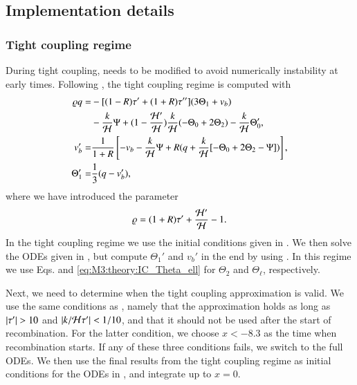 \subsection{Implementation details}\label{ssec:M3:implementations} 
\subsubsection{Tight coupling regime} \label{sssec:M3:implementations:tight_coupling_regime}
During tight coupling,  needs to be modified to avoid numerically instability at early times. Following \citeauthor{callin}, the tight coupling regime is computed with 
\begin{subequations} \label{eq:M3:implementations:TC_ODEs}
    \begin{align}
        \varrho q =& -[(1-R)\tau' + (1+R)\tau''](3\Theta_1 + v_b) \nonumber \\
            & -\frac{k}{\mathcal{H}}\Psi + (1-\frac{\mathcal{H}'}{\mathcal{H}})\frac{k}{\mathcal{H}}(-\Theta_0 + 2\Theta_2) - \frac{k}{\mathcal{H}}\Theta_0', \label{eq:M3:implementations:TC_ODEs_q} \\
        v_b' =& \frac{1}{1+R}\left[ -v_b-\frac{k}{\mathcal{H}}\Psi + R(q+\frac{k}{\mathcal{H}}[-\Theta_0+2\Theta_2-\Psi]) \right], \label{eq:M3:implementations:TC_ODEs_v_b} \\
        \Theta_1' =& \frac{1}{3}(q-v_b'), \label{eq:M3:implementations:TC_ODEs_Theta_1} 
    \end{align}
\end{subequations} 
where we have introduced the parameter 
\begin{equation} \label{eq:M3:implementations:q_prefactor}
    \varrho = (1+R)\tau' + \frac{\mathcal{H}'}{\mathcal{H}} - 1.
\end{equation}
In the tight coupling regime we use the initial conditions given in . We then solve the ODEs given in , but compute $\Theta_1'$ and $v_b'$ in the end by using . In this regime we use Eqs.  and \eqref{eq:M3:theory:IC_Theta_ell} for $\Theta_2$ and $\Theta_\ell$, respectively. 

Next, we need to determine when the tight coupling approximation is valid. We use the same conditions as \citeauthor{callin}, namely that the approximation holds as long as $\abs{\tau'}>10$ and $\abs{k/\mathcal{H}\tau'}<1/10$, and that it should not be used after the start of recombination. For the latter condition, we choose $x<-8.3$ as the time when recombination starts. If any of these three conditions fails, we switch to the full ODEs. We then use the final results from the tight coupling regime as initial conditions for the ODEs in , and integrate up to $x=0$. 


